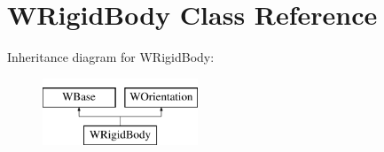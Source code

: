 \hypertarget{class_w_rigid_body}{}\section{W\+Rigid\+Body Class Reference}
\label{class_w_rigid_body}
Inheritance diagram for W\+Rigid\+Body\+:\begin{figure}[H]
\begin{center}
\leavevmode
\includegraphics[height=2.000000cm]{class_w_rigid_body}
\end{center}
\end{figure}
